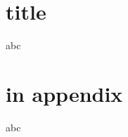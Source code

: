 \documentclass{beamer}
\begin{document}
\section{title}
\begin{frame}
    abc
\end{frame} 

\hypersetup{bookmarksdepth=0}

\appendix

\section{in appendix}
\begin{frame}
    abc
\end{frame} 
\end{document}
